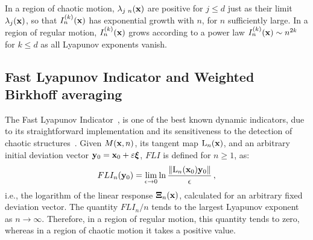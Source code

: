 In a region of chaotic motion, $\lambda_{j\,\,n}(\vb{x})$ are positive for $j\le d$ just as their limit $\lambda_j(\vb{x})$,  so that $I_n^{(k)}(\vb{x})$ has exponential growth with $n$, for $n$ sufficiently large. In a region of regular motion, $I^{(k)}_n(\vb{x})$ grows according to a power law $I^{(k)}_n(\vb{x}) \sim n^{2k}$ for $k\le d$ as all Lyapunov exponents vanish.
%
\subsection{Fast Lyapunov Indicator and Weighted Birkhoff averaging\label{subsec:fli}}
%
The Fast Lyapunov Indicator~\cite{Froeschle1997}, is one of the best known dynamic indicators, due to its straightforward implementation and its sensitiveness to the detection of chaotic structures~\cite{Lega2016fli}. Given $M(\vb{x}, n)$, its tangent map $\mathrm{L}_n(\vb{x})$, and an arbitrary initial deviation vector $\vb{y}_0=\vb{x}_0+\varepsilon\boldsymbol{\xi}$, $FLI$ is defined for $n\geq1$, as:
\begin{equation}
    FLI_n(\vb{y}_0) = \lim_{\epsilon \to 0}\ln{\frac{\norm{\mathrm{L}_n(\vb{x}_0) \vb{y}_0}}{\epsilon}} \, ,
    \label{eq:fli}
\end{equation}
i.e., the logarithm of the linear response $\boldsymbol{\Xi}_n(\vb{x})$, calculated for an arbitrary fixed deviation vector. The quantity $FLI_n/n$ tends to the largest Lyapunov exponent as $n\to \infty$. Therefore, in a region of regular motion, this quantity tends to zero, whereas in a region of chaotic motion it takes a positive value.

